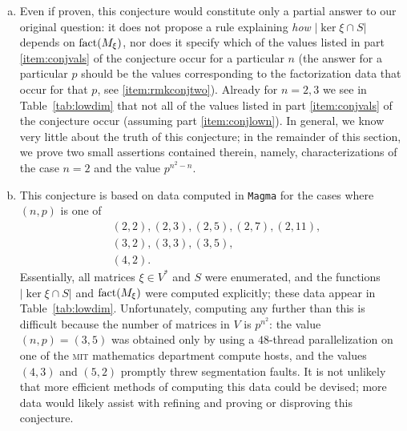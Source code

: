 \begin{rem}
\label{rem:conj}
\begin{enumerate}[(a)]
\item Even if proven, this conjecture would constitute only a partial answer to our original question: it does not propose a rule explaining \emph{how} $|\ker\xi\cap S|$ depends on $\operatorname{fact}(M_\xi)$, nor does it specify which of the values listed in part \eqref{item:conjvals} of the conjecture occur for a particular $n$ (the answer for a particular $p$ should be the values corresponding to the factorization data that occur for that $p$, see \eqref{item:rmkconjtwo}). Already for $n=2,3$ we see in Table~\ref{tab:lowdim} that not all of the values listed in part \eqref{item:conjvals} of the conjecture occur (assuming part \eqref{item:conjlown}). In general, we know very little about the truth of this conjecture; in the remainder of this section, we prove two small assertions contained therein, namely, characterizations of the case $n=2$ and the value $p^{n^2-n}$.
\item This conjecture is based on data computed in \texttt{Magma} \cite{magma} for the cases where $(n,p)$ is one of
\begin{align*}
&(2,2),(2,3),(2,5),(2,7),(2,11),\\
&(3,2),(3,3),(3,5),\\
&(4,2).
\end{align*}
Essentially, all matrices $\xi\in V^*$ and $S$ were enumerated, and the functions $|\ker\xi\cap S|$ and $\operatorname{fact}(M_\xi)$ were computed explicitly; these data appear in Table~\ref{tab:lowdim}. Unfortunately, computing any further than this is difficult because the number of matrices in $V$ is $p^{n^2}$: the value $(n,p)=(3,5)$ was obtained only by using a $48$-thread parallelization on one of the \textsc{mit} mathematics department compute hosts, and the values $(4,3)$ and $(5,2)$ promptly threw segmentation faults. It is not unlikely that more efficient methods of computing this data could be devised; more data would likely assist with refining and proving or disproving this conjecture.\label{item:rmkconjone}


\end{enumerate}
\end{rem}
